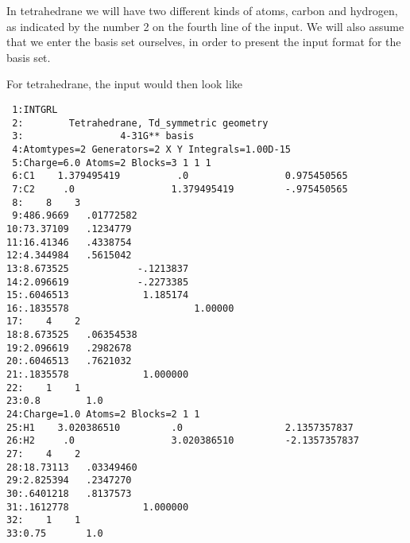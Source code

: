 In tetrahedrane we will have two different kinds of atoms, carbon
and hydrogen, as indicated by the number 2 on the fourth line of the input.
We will also assume that we enter the basis set ourselves,
in order to present the input format for the basis set.

For tetrahedrane, the input would then look like
\begin{verbatim}
 1:INTGRL
 2:        Tetrahedrane, Td_symmetric geometry
 3:                 4-31G** basis
 4:Atomtypes=2 Generators=2 X Y Integrals=1.00D-15
 5:Charge=6.0 Atoms=2 Blocks=3 1 1 1
 6:C1    1.379495419          .0                 0.975450565
 7:C2     .0                 1.379495419         -.975450565
 8:    8    3
 9:486.9669   .01772582
10:73.37109   .1234779
11:16.41346   .4338754
12:4.344984   .5615042
13:8.673525            -.1213837
14:2.096619            -.2273385
15:.6046513             1.185174
16:.1835578                      1.00000
17:    4    2
18:8.673525   .06354538
19:2.096619   .2982678
20:.6046513   .7621032
21:.1835578             1.000000
22:    1    1
23:0.8        1.0
24:Charge=1.0 Atoms=2 Blocks=2 1 1
25:H1    3.020386510         .0                  2.1357357837
26:H2     .0                 3.020386510         -2.1357357837
27:    4    2
28:18.73113   .03349460
29:2.825394   .2347270
30:.6401218   .8137573
31:.1612778             1.000000
32:    1    1
33:0.75       1.0
\end{verbatim}

